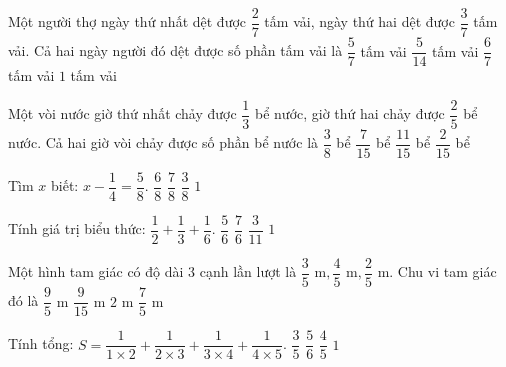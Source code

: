 \begin{ex} %
Một người thợ ngày thứ nhất dệt được $\dfrac{2}{7}$ tấm vải, ngày thứ hai dệt được $\dfrac{3}{7}$ tấm vải. Cả hai ngày người đó dệt được số phần tấm vải là
\choice
{\True $\dfrac{5}{7}$ tấm vải}
{$\dfrac{5}{14}$ tấm vải}
{$\dfrac{6}{7}$ tấm vải}
{$1$ tấm vải}
\end{ex}

\begin{ex} %
Một vòi nước giờ thứ nhất chảy được $\dfrac{1}{3}$ bể nước, giờ thứ hai chảy được $\dfrac{2}{5}$ bể nước. Cả hai giờ vòi chảy được số phần bể nước là
\choice
{$\dfrac{3}{8}$ bể}
{$\dfrac{7}{15}$ bể}
{\True $\dfrac{11}{15}$ bể}
{$\dfrac{2}{15}$ bể}
\end{ex}

\begin{ex} %
Tìm $x$ biết: $x - \dfrac{1}{4} = \dfrac{5}{8}$.
\choice
{$\dfrac{6}{8}$}
{\True $\dfrac{7}{8}$}
{$\dfrac{3}{8}$}
{$1$}
\end{ex}

\begin{ex} %
Tính giá trị biểu thức: $\dfrac{1}{2} + \dfrac{1}{3} + \dfrac{1}{6}$.
\choice
{$\dfrac{5}{6}$}
{$\dfrac{7}{6}$}
{$\dfrac{3}{11}$}
{\True $1$}
\end{ex}

\begin{ex} %
Một hình tam giác có độ dài 3 cạnh lần lượt là $\dfrac{3}{5}\text{ m}, \dfrac{4}{5}\text{ m}, \dfrac{2}{5}\text{ m}$. Chu vi tam giác đó là
\choice
{\True $\dfrac{9}{5}\text{ m}$}
{$\dfrac{9}{15}\text{ m}$}
{$2\text{ m}$}
{$\dfrac{7}{5}\text{ m}$}
\end{ex}

\begin{ex} %
Tính tổng: $S = \dfrac{1}{1 \times 2} + \dfrac{1}{2 \times 3} + \dfrac{1}{3 \times 4} + \dfrac{1}{4 \times 5}$.
\choice
{$\dfrac{3}{5}$}
{$\dfrac{5}{6}$}
{\True $\dfrac{4}{5}$}
{$1$}
\end{ex}

